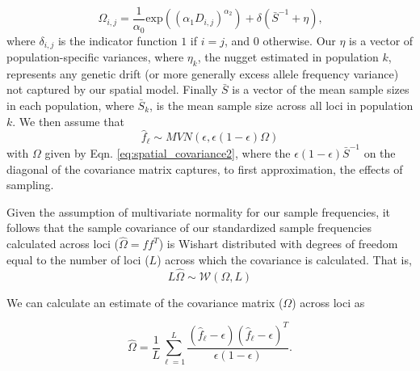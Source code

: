 \documentclass[12pt]{article}
\newcommand{\gb}[1]{{\em \color{magenta} #1}}
\newcommand{\plr}[1]{{\em \color{green} #1}}
\newcommand{\gc}[1]{{\em \color{blue} #1}}
\begin{document}
\begin{equation}
\label{eq:spatial_covariance2}
\Omega_{i,j} = \frac{1}{\alpha_0} \text{exp} \left(	\left( \alpha_1D_{i,j} \right)^{\alpha_2} \right) + \delta(\bar{S}^{-1} + \eta) \text{,}
\end{equation}
where $\delta_{i,j}$ is the indicator function $1$ if $i=j$, and $0$ otherwise. Our $\eta$ is a vector of population-specific variances, where $\eta_k$, the nugget estimated in population $k$, represents any genetic drift (or more generally excess allele frequency variance) not captured by our spatial model. Finally $\bar{S}$ is a vector of the mean sample sizes in each population, where $\bar{S}_k$, is the mean sample size across all loci in population $k$.  We then assume that
\begin{equation}
\hat{f}_{\ell} \sim MVN(\epsilon, \epsilon (1-\epsilon)\Omega)
\end{equation}
with $\Omega$ given by Eqn. \eqref{eq:spatial_covariance2},  where the $\epsilon(1-\epsilon)  \bar{S}^{-1}$ on the diagonal of the covariance matrix captures, to first approximation, the effects of sampling.

Given the assumption of multivariate normality for our sample frequencies, it follows that the sample covariance of our standardized sample frequencies calculated across loci ($\widehat{\Omega} = f f^T$)  is Wishart distributed with degrees of freedom equal to the number of loci ($L$) across which the covariance is calculated.
That is, 
\begin{equation}
\label{eq:wishart_dist}
L \widehat{\Omega} \sim \mathcal{W}\left( \Omega, L	\right)
\end{equation}

We can calculate an estimate of the covariance matrix ($\Omega$) across loci as 

\begin{equation}
\label{eq:sample_cov}
\widehat{\Omega} = \frac{1}{L} \sum_{\ell=1}^{L} \frac{(\hat{f}_{\ell}  - \epsilon) (\hat{f}_{\ell}  - \epsilon)^T}{\epsilon(1-\epsilon)} \text{.}
\end{equation}
\end{document}
